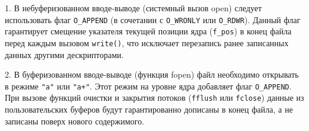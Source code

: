 1. В небуферизованном вводе-выводе (системный вызов open) следует использовать флаг \texttt{O\_APPEND} (в сочетании с \texttt{O\_WRONLY} или \texttt{O\_RDWR}). Данный флаг гарантирует смещение указателя текущей позиции ядра (\texttt{f\_pos}) в конец файла перед каждым вызовом \texttt{write()}, что исключает перезапись ранее записанных данных другими дескрипторами.

2. В буферизованном вводе-выводе (функция fopen) файл необходимо открывать в режиме \texttt{"a"} или \texttt{"a+"}. Этот режим на уровне ядра добавляет флаг \texttt{O\_APPEND}. При вызове функций очистки и закрытия потоков (\texttt{fflush} или \texttt{fclose}) данные из пользовательских буферов будут гарантированно дописаны в конец файла, а не записаны поверх нового содержимого.

